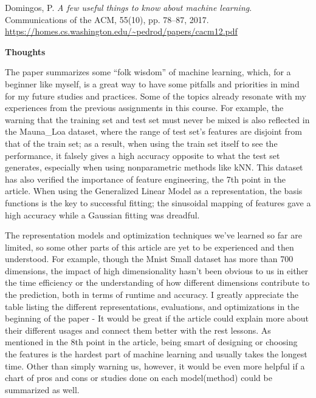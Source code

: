 \documentclass{article} %
\begin{document}
  Domingos, P. \textit{A few useful things to know about machine learning}. Communications of the ACM, 55(10), pp. 78–87, 2017. \url{https://homes.cs.washington.edu/~pedrod/papers/cacm12.pdf}

\vspace{1cm}
{\large\textbf{Thoughts}}

  The paper summarizes some ``folk wisdom'' of machine learning, which, for a beginner like myself, is a great way to have some pitfalls and priorities in mind for my future studies and practices. Some of the topics already resonate with my experiences from the previous assignments in this course. For example, the warning that the training set and test set must never be mixed is also reflected in the Mauna\_Loa dataset, where the range of test set's features are disjoint from that of the train set; as a result, when using the train set itself to see the performance, it falsely gives a high accuracy opposite to what the test set generates, especially when using nonparametric methods like kNN. This dataset has also verified the importance of feature engineering, the 7th point in the article.
  When using the Generalized Linear Model as a representation, the basis functions is the key to successful fitting; the sinusoidal mapping of features gave a high accuracy while a Gaussian fitting was dreadful.


  The representation models and optimization techniques we've learned so far are limited, so some other parts of this article are yet to be experienced and then understood. For example, though the Mnist Small dataset has more than 700 dimensions, the impact of high dimensionality hasn’t been obvious to us in either the time efficiency or the understanding of how different dimensions contribute to the prediction, both in terms of runtime and accuracy. I greatly appreciate the table listing the different representations, evaluations, and optimizations in the beginning of the paper - It would be great if the article could explain more about their different usages and connect them better with the rest lessons. As mentioned in the 8th point in the article, being smart of designing or choosing the features is the hardest part of machine learning and usually takes the longest time. Other than simply warning us, however, it would be even more helpful if a chart of pros and cons or studies done on each model(method) could be summarized as well.
\end{document}
